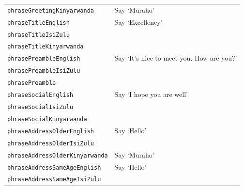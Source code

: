 \documentclass{CSSRforAfrica}
\begin{document}
\begin{table}[H]
\begin{center}
\begin{tabular}{|l l|}
{\footnotesize \verb+phraseGreetingKinyarwanda+}     & {\footnotesize Say `Muraho'}\vspace{-1mm}\\
{\footnotesize \verb+phraseTitleEnglish+}     & {\footnotesize  Say `Excellency'}\vspace{-1mm}\\
{\footnotesize \verb+phraseTitleIsiZulu+}     & {\footnotesize  }\vspace{-1mm}\\
{\footnotesize \verb+phraseTitleKinyarwanda+}     & {\footnotesize }\vspace{-1mm}\\
{\footnotesize \verb+phrasePreambleEnglish+}     & {\footnotesize    Say `It's nice to meet you. How are you?'}\vspace{-1mm}\\
{\footnotesize \verb+phrasePreambleIsiZulu+}     & {\footnotesize  }\vspace{-1mm}\\
{\footnotesize \verb+phrasePreamble+}     & {\footnotesize }\vspace{-1mm}\\
{\footnotesize \verb+phraseSocialEnglish+}     & {\footnotesize   Say `I hope you are well'}\vspace{-1mm}\\
{\footnotesize \verb+phraseSocialIsiZulu+}     & {\footnotesize }\vspace{-1mm}\\
{\footnotesize \verb+phraseSocialKinyarwanda+}     & {\footnotesize  }\vspace{-1mm}\\
{\footnotesize \verb+phraseAddressOlderEnglish+}     & {\footnotesize  Say  `Hello' } \vspace{-1mm}\\
{\footnotesize \verb+phraseAddressOlderIsiZulu+}     & {\footnotesize    } \vspace{-1mm}\\
{\footnotesize \verb+phraseAddressOlderKinyarwanda+}     & {\footnotesize Say `Muraho'} \vspace{-1mm}\\
{\footnotesize \verb+phraseAddressSameAgeEnglish+}     & {\footnotesize   Say  `Hello'} \vspace{-1mm}\\
{\footnotesize \verb+phraseAddressSameAgeIsiZulu+}     & {\footnotesize   } \vspace{-1mm}\\

\end{tabular}
\end{center}
\end{table}
\end{document}
